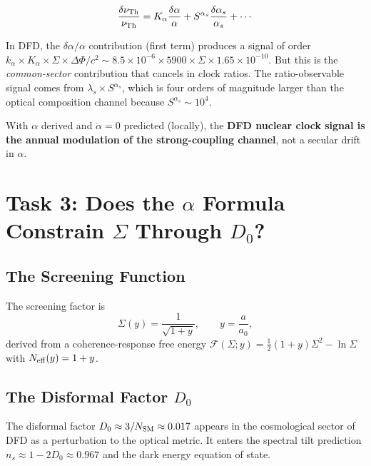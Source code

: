 \documentclass[11pt]{article}
\newcommand{\kalpha}{k_\alpha}
\theoremstyle{definition}
\theoremstyle{remark}
\begin{document}
\begin{equation}
\frac{\delta\nu_{\rm Th}}{\nu_{\rm Th}}
= K_\alpha \frac{\delta\alpha}{\alpha}
+ S^{\alpha_s} \frac{\delta\alpha_s}{\alpha_s} + \cdots
\end{equation}

In DFD, the $\delta\alpha/\alpha$ contribution (first term) produces a
signal of order $\kalpha \times K_\alpha \times \Sigma \times
\Delta\Phi/c^2 \sim 8.5 \times 10^{-6} \times 5900 \times \Sigma \times
1.65 \times 10^{-10}$. But this is the \emph{common-sector} contribution
that cancels in clock ratios. The ratio-observable signal comes from
$\lambda_s \times S^{\alpha_s}$, which is four orders of magnitude larger
than the optical composition channel because $S^{\alpha_s} \sim 10^4$.

With $\alpha$ derived and $\dot\alpha = 0$ predicted (locally), the
\textbf{DFD nuclear clock signal is the annual modulation of the
strong-coupling channel}, not a secular drift in $\alpha$.

\section{Task 3: Does the $\alpha$ Formula Constrain $\Sigma$ Through $D_0$?}
\label{sec:screening}

\subsection{The Screening Function}

The screening factor is
\begin{equation}\label{eq:Sigma}
\Sigma(y) = \frac{1}{\sqrt{1 + y}}, \qquad y = \frac{a}{a_0},
\end{equation}
derived from a coherence-response free energy
$\mathcal{F}(\Sigma; y) = \frac{1}{2}(1+y)\Sigma^2 - \ln\Sigma$
with $N_{\rm eff}(y) = 1 + y$.

\subsection{The Disformal Factor $D_0$}

The disformal factor $D_0 \approx 3/N_{\rm SM} \approx 0.017$ appears in
the cosmological sector of DFD as a perturbation to the optical metric.
It enters the spectral tilt prediction $n_s \approx 1 - 2D_0 \approx 0.967$
and the dark energy equation of state.
\end{document}
